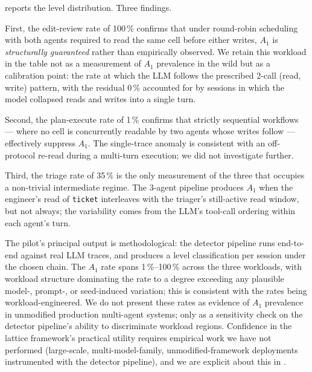 \documentclass[journal,compsoc,10pt]{IEEEtran}
\theoremstyle{definition}
\theoremstyle{remark}
\begin{document}
 reports the level distribution. Three
findings.

First, the edit-review rate of 100\,\% confirms that under
round-robin scheduling with both agents required to read the same
cell before either writes, $A_1$ is \emph{structurally guaranteed}
rather than empirically observed. We retain this workload in the
table not as a measurement of $A_1$ prevalence in the wild but as a
calibration point: the rate at which the LLM follows the prescribed
2-call (read, write) pattern, with the residual 0\,\% accounted for
by sessions in which the model collapsed reads and writes into a
single turn.

Second, the plan-execute rate of 1\,\% confirms that strictly
sequential workflows --- where no cell is concurrently readable by
two agents whose writes follow --- effectively suppress $A_1$. The
single-trace anomaly is consistent with an off-protocol re-read
during a multi-turn execution; we did not investigate further.

Third, the triage rate of 35\,\% is the only measurement of the
three that occupies a non-trivial intermediate regime. The
3-agent pipeline produces $A_1$ when the engineer's read of
\texttt{ticket} interleaves with the triager's still-active read
window, but not always; the variability comes from the LLM's
tool-call ordering within each agent's turn.

The pilot's principal output is methodological: the detector
pipeline runs end-to-end against real LLM traces, and produces a
level classification per session under the chosen chain. The
$A_1$ rate spans 1\,\%--100\,\% across the three workloads, with
workload structure dominating the rate to a degree exceeding any
plausible model-, prompt-, or seed-induced variation; this is
consistent with the rates being workload-engineered. We do not
present these rates as evidence of $A_1$ prevalence in unmodified
production multi-agent systems; only as a sensitivity check on
the detector pipeline's ability to discriminate workload regions.
Confidence in the lattice framework's practical utility requires
empirical work we have not performed (large-scale,
multi-model-family, unmodified-framework deployments instrumented
with the detector pipeline), and we are explicit about this in
.
\end{document}
